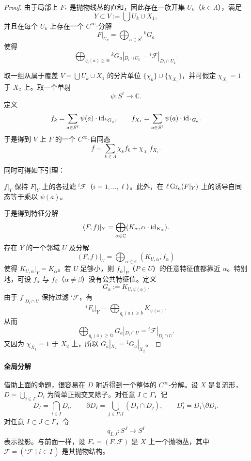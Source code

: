 \begin{proof}
由于局部上 \(F_*\) 是抛物线丛的直和，因此存在一族开集 \(U_k\)（\(k\in\Lambda\)），满足
\[
Y\subset V:=\bigcup U_k\cup X_1,
\]
并且在每个 \(U_k\) 上存在一个 \(C^\infty\)-分解
\[
F|_{U_k}=\bigoplus_{a\in S^\ell} {}^kG_a
\]
使得
\[
\bigoplus_{q_i(a)\ge @} {}^kG_a|_{D_i\cap U_k}
=
{}^i\mathcal F|_{D_i\cap U_k}.
\]

取一组从属于覆盖 \(V=\bigcup U_k\cup X_1\) 的分片单位 \(\{\chi_k\}\cup \{\chi_{X_1}\}\)，并可假定 \(\chi_{X_1}=1\) 于 \(X_2\) 上。取一个单射
\[
\psi:S^\ell\to \mathbb C.
\]
定义
\[
f_k=\sum_{a\in S^\ell}\psi(a)\cdot \mathrm{id}_{{}^kG_a},
\qquad
f_{X_1}=\sum_{a\in S^\ell}\psi(a)\cdot \mathrm{id}_{{}^1G_a}.
\]
于是得到 \(V\) 上 \(F\) 的一个 \(C^\infty\)-自同态
\[
f=\sum_{k\in\Lambda}\chi_k f_k+\chi_{X_1}f_{X_1}.
\]

同时可得如下引理：

\begin{lemma}
\(f|_Y\) 保持 \(F|_Y\) 上的各过滤 \({}^i\mathcal F\)（\(i=1,\dots,\ell\)）。此外，在 \(\ell\operatorname{Gr}_a(F|_Y)\) 上的诱导自同态等于乘以 \(\psi(a)\)。
\end{lemma}

于是得到特征分解
\[
(F,f)|_Y=\bigoplus_{\alpha\in\mathbb C}(K_\alpha,\alpha\cdot \mathrm{id}_{K_\alpha}).
\]
存在 \(Y\) 的一个邻域 \(U\) 及分解
\[
(F,f)|_U=\bigoplus_{\alpha\in\mathbb C}(K_{U,\alpha},f_\alpha)
\]
使得 \(K_{U,\alpha}|_Y=K_\alpha\)。若 \(U\) 足够小，则 \(f_\alpha|_P\)（\(P\in U\)）的任意特征值都靠近 \(\alpha\)。特别地，可设 \(f_\alpha\) 与 \(f_\beta\)（\(\alpha\ne\beta\)）没有公共特征值。定义
\[
G_a:=K_{U,\psi(a)}.
\]
由于 \(f|_{D_i\cap U}\) 保持过滤 \({}^i\mathcal F\)，有
\[
{}^iF_b|_Y=\bigoplus_{q_i(a)\ge b}K_{\psi(a)}.
\]
从而
\[
\bigoplus_{q_i(a)\ge @}G_a|_{D_i\cap U}
=
{}^i\mathcal F|_{D_i\cap U}.
\]
又因为 \(\chi_{X_1}=1\) 于 \(X_2\) 上，所以 \(G_a|_{X_2}={}^1G_a|_{X_2}\)。
\end{proof}

\paragraph{全局分解}
借助上面的命题，很容易在 \(D\) 附近得到一个整体的 \(C^\infty\)-分解。设 \(X\) 是复流形，\(D=\bigcup_{i\in\Gamma}D_i\) 为简单正规交叉除子。对任意 \(I\subset \Gamma\)，记
\[
D_I=\bigcap_{i\in I}D_i,\qquad
\partial D_I=\bigcup_{j\in \Gamma\setminus I}(D_I\cap D_j),\qquad
D_I^\circ=D_I\setminus \partial D_I.
\]
对任意 \(I\subset J\subset \Gamma\)，令
\[
q_{I,J}:S^J\to S^I
\]
表示投影。与前面一样，设 \(F_*=(F,\mathcal F)\) 是 \(X\) 上一个抛物丛，其中 \(\mathcal F=({}^i\mathcal F\mid i\in\Gamma)\) 是其抛物结构。

